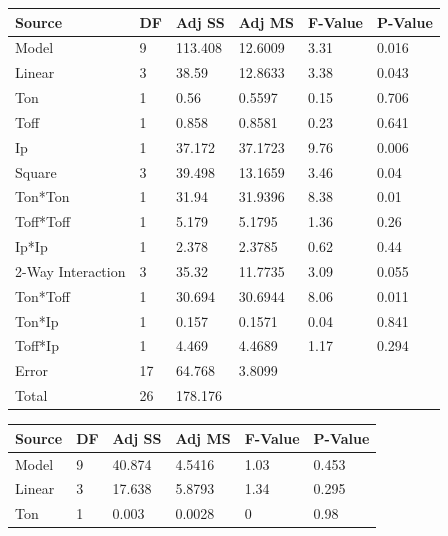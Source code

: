 \documentclass[suppldata]{interact}
\begin{document}
\begin{landscape}
 \begin{minipage}{0.50\textwidth}
\centering
    \centering
 \begin{tabular}{|l|l|l|l|l|l|}
    \hline
        Source & DF & Adj SS & Adj MS & F-Value & P-Value \\ \hline
        Model & 9 & 113.408 & 12.6009 & 3.31 & 0.016 \\ \hline
        Linear & 3 & 38.59 & 12.8633 & 3.38 & 0.043 \\ \hline
        Ton & 1 & 0.56 & 0.5597 & 0.15 & 0.706 \\ \hline
        Toff & 1 & 0.858 & 0.8581 & 0.23 & 0.641 \\ \hline
        Ip & 1 & 37.172 & 37.1723 & 9.76 & 0.006 \\ \hline
        Square & 3 & 39.498 & 13.1659 & 3.46 & 0.04 \\ \hline
        Ton*Ton & 1 & 31.94 & 31.9396 & 8.38 & 0.01 \\ \hline
        Toff*Toff & 1 & 5.179 & 5.1795 & 1.36 & 0.26 \\ \hline
        Ip*Ip & 1 & 2.378 & 2.3785 & 0.62 & 0.44 \\ \hline
        2-Way Interaction & 3 & 35.32 & 11.7735 & 3.09 & 0.055 \\ \hline
        Ton*Toff & 1 & 30.694 & 30.6944 & 8.06 & 0.011 \\ \hline
        Ton*Ip & 1 & 0.157 & 0.1571 & 0.04 & 0.841 \\ \hline
        Toff*Ip & 1 & 4.469 & 4.4689 & 1.17 & 0.294 \\ \hline
        Error & 17 & 64.768 & 3.8099 & ~ & ~ \\ \hline
        Total & 26 & 178.176 & ~ & ~ & ~ \\ \hline
    \end{tabular}
    \label{tab:annovaRz}
 \end{minipage}
    \hfill 
     \begin{minipage}{0.70\textwidth}
\centering
    \centering
    \centering
     \begin{tabular}{|l|l|l|l|l|l|}
    \hline
        Source & DF & Adj SS & Adj MS & F-Value & P-Value \\ \hline
        Model & 9 & 40.874 & 4.5416 & 1.03 & 0.453 \\ \hline
        Linear & 3 & 17.638 & 5.8793 & 1.34 & 0.295 \\ \hline
        Ton & 1 & 0.003 & 0.0028 & 0 & 0.98 \\ \hline

\end{tabular}
\end{minipage}
\end{landscape}
\end{document}
